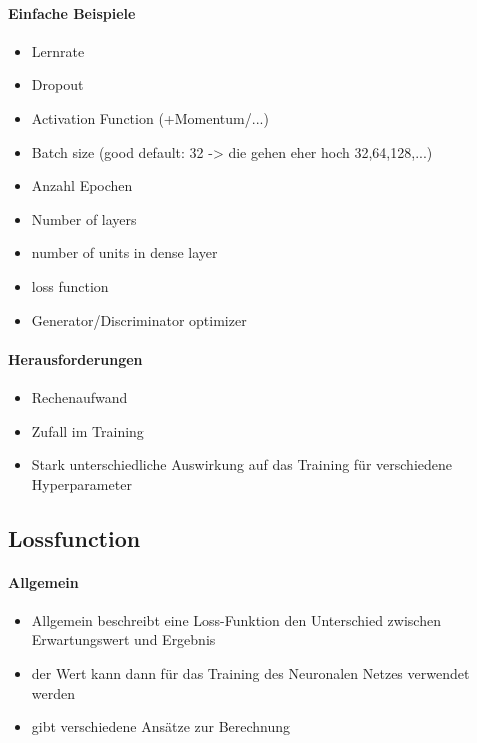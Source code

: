 \paragraph{Einfache Beispiele \cite{hyperparameters-gan-using-genetic-algorithm, hyperparameters-what-how}}
\begin{itemize}
	\item Lernrate
	\item Dropout
	\item Activation Function (+Momentum/...)
	\item Batch size (good default: 32 -> die gehen eher hoch 32,64,128,...)
	\item Anzahl Epochen
	\item Number of layers
	\item number of units in dense layer
	\item loss function
	\item Generator/Discriminator optimizer
\end{itemize}

\paragraph{Herausforderungen \cite{hyperparameters-search-in-machine-learning}}
\begin{itemize}
	\item Rechenaufwand
	\item Zufall im Training
	\item Stark unterschiedliche Auswirkung auf das Training für verschiedene Hyperparameter
\end{itemize}

\subsection{Lossfunction}
\paragraph{Allgemein \cite{lossfunction-opportunities-and-challenges, common-loss, russel-norvig}}
\begin{itemize}
	\item Allgemein beschreibt eine Loss-Funktion den Unterschied zwischen Erwartungswert und Ergebnis
	\item der Wert kann dann für das Training des Neuronalen Netzes verwendet werden
	\item gibt verschiedene Ansätze zur Berechnung
\end{itemize}

